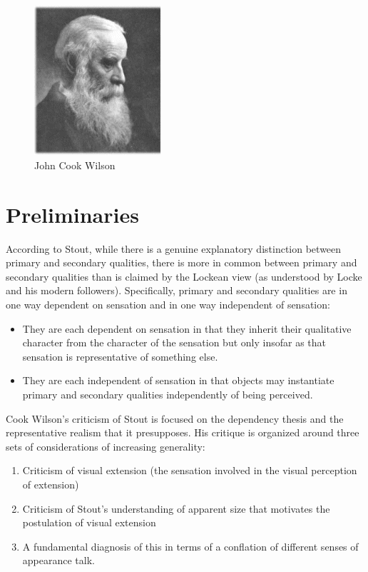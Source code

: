 \documentclass[11pt]{article}
\title{\mytitle\\
\mysubtitle}
\author{\myauthor}
\date{} %
\begin{document}
\maketitle

\setlength{\parindent}{1em}


\begin{figure}[htbp]
	\centering
		\includegraphics[scale=1]{../../graphics/wilson.jpg}
	\caption{John Cook Wilson}
	\label{fig:wilson}
\end{figure}

\section{Preliminaries}\label{sec:preliminaries} %

According to Stout, while there is a genuine explanatory distinction between primary and secondary qualities, there is more in common between primary and secondary qualities than is claimed by the Lockean view (as understood by Locke and his modern followers). Specifically, primary and secondary qualities are in one way dependent on sensation and in one way independent of sensation:
    \begin{itemize}
        \item They are each dependent on sensation in that they inherit their qualitative character from the character of the sensation but only insofar as that sensation is representative of something else.
        \item They are each independent of sensation in that objects may instantiate primary and secondary qualities independently of being perceived.
    \end{itemize}

Cook Wilson's criticism of Stout is focused on the dependency thesis and the representative realism that it presupposes. His critique is organized around three sets of considerations of increasing generality:
    \begin{enumerate}
        \item Criticism of visual extension (the sensation involved in the visual perception of extension)
        \item Criticism of Stout's understanding of apparent size that motivates the postulation of visual extension
        \item A fundamental diagnosis of this in terms of a conflation of different senses of appearance talk.
    \end{enumerate}
\end{document}
